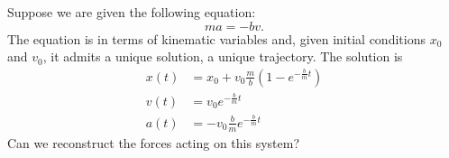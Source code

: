 Suppose we are given the following equation:
\begin{equation}\label{rp-cm-frictionEquation}
	m a = - b v .
\end{equation}
The equation is in terms of kinematic variables and, given initial conditions $x_0$ and $v_0$, it admits a unique solution, a unique trajectory.
The solution is
\begin{equation}
	\begin{aligned}
	x(t)&= x_0 + v_0 \frac{m}{b} \left( 1 - e^{-\frac{b}{m}t}\right) \\
	v(t)&= v_0 e^{-\frac{b}{m}t} \\
	a(t)&= - v_0 \frac{b}{m} e^{-\frac{b}{m}t}
	\end{aligned}
\end{equation}
Can we reconstruct the forces acting on this system?

